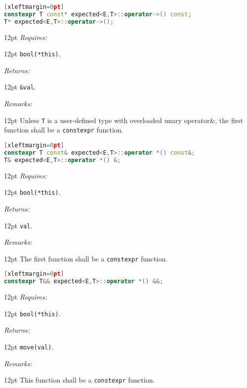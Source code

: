 \documentclass[a4paper,10pt]{article}
\newcommand{\cpp}[1]{\lstinline{#1}}
\newcommand{\wordingItem}[1]{\noindent\textit{#1:}}
\newenvironment{wordingTextItem}[1]{\wordingItem{#1}\vspace{2pt}\noindent\begin{adjustwidth}{12pt}{}}{\vspace{2pt}\end{adjustwidth}}
\newenvironment{wordingPara}{\begin{adjustwidth}{12pt}{}}{\end{adjustwidth}}
\begin{document}
\begin{lstlisting}[language=C++][xleftmargin=0pt]
constexpr T const* expected<E,T>::operator->() const;
T* expected<E,T>::operator->(); 
\end{lstlisting}
\begin{wordingPara}
\begin{wordingTextItem}{Requires}
\cpp{bool(*this)}.
\end{wordingTextItem}
\begin{wordingTextItem}{Returns}
\cpp{&val}.
\end{wordingTextItem}
\begin{wordingTextItem}{Remarks}
Unless \cpp{T} is a user-defined type with overloaded unary operator\&, the first function shall be a \cpp{constexpr} function.
\end{wordingTextItem}
\end{wordingPara}

\begin{lstlisting}[language=C++][xleftmargin=0pt]
constexpr T const& expected<E,T>::operator *() const&;
T& expected<E,T>::operator *() &;
\end{lstlisting}
\begin{wordingPara}
\begin{wordingTextItem}{Requires}
\cpp{bool(*this)}.
\end{wordingTextItem}
\begin{wordingTextItem}{Returns}
\cpp{val}.
\end{wordingTextItem}
\begin{wordingTextItem}{Remarks}
The first function shall be a \cpp{constexpr} function.
\end{wordingTextItem}
\end{wordingPara}

\begin{lstlisting}[language=C++][xleftmargin=0pt]
constexpr T&& expected<E,T>::operator *() &&;
\end{lstlisting}
\begin{wordingPara}
\begin{wordingTextItem}{Requires}
\cpp{bool(*this)}.
\end{wordingTextItem}
\begin{wordingTextItem}{Returns}
\cpp{move(val)}.
\end{wordingTextItem}
\begin{wordingTextItem}{Remarks}
This function shall be a \cpp{constexpr} function.
\end{wordingTextItem}
\end{wordingPara}
\end{document}

